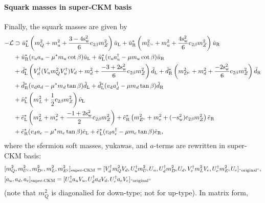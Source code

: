 \documentclass[CheatSheet]{subfiles}
\begin{document}
\paragraph{Squark masses in super-CKM basis}
Finally, the squark masses are given by
\begin{equation}
 \begin{split}
-\mathcal L&\supset
 \tilde u_{\mathrm{L}}^*\left(
   m_{Q}^2
 +  m_u^2
 + \frac{3-4\mathrm{s}_{\mathrm w}^2}{6} \mathrm{c}_{2\beta} m_Z^2
\right)\tilde u_{\mathrm{L}}
 +\tilde u_{\mathrm{R}}^*\left(
   m_{U^{\mathrm{c}}}^2
 + m_u^2
 + \frac{4\mathrm{s}_{\mathrm w}^2}{6} \mathrm{c}_{2\beta} m_Z^2
\right)\tilde u_{\mathrm{R}}
\\&
 + \tilde u_{\mathrm{R}}^*(v_{\mathrm{u}} a_{{\mathrm u}}- \mu^{*}m_{u}\cot\beta)\tilde u_{\mathrm{L}}
 + \tilde u_{\mathrm{L}}^*(v_{\mathrm{u}} a^{\dagger}_{{\mathrm u}}- \mu m_u\cot\beta)\tilde u_{\mathrm{R}}
\\&
 +\tilde d_{\mathrm{L}}^*\left(
V_d^\dagger (V_u m_{Q}^2 V_u^\dagger)V_d
 + m_d^2
 + \frac{-3+2\mathrm{s}_{\mathrm w}^2}{6} \mathrm{c}_{2\beta} m_Z^2
\right)\tilde d_{\mathrm{L}}
 +\tilde d_{\mathrm{R}}^*\left(
   m_{D^{\mathrm{c}}}^2
 + m_d^2
 + \frac{-2\mathrm{s}_{\mathrm w}^2}{6} \mathrm{c}_{2\beta} m_Z^2
\right)\tilde d_{\mathrm{R}}
\\&
 + \tilde d_{\mathrm{R}}^*(v_{\mathrm{d}} a_d -\mu^{*}m_d\tan\beta)\tilde d_{\mathrm{L}}
 + \tilde d_{\mathrm{L}}^*(v_{\mathrm{d}} a^{\dagger}_d-\mu m_d\tan\beta)\tilde d_{\mathrm{R}}
\\&
 +\tilde \nu_{\mathrm{L}}^*\left(
 m_{L}^2
 + \frac{1}{2} \mathrm{c}_{2\beta} m_Z^2
 \right)\tilde \nu_{\mathrm{L}}
\\&
 +\tilde e_{\mathrm{L}}^*\left(
 m_{L}^2
 + m_e^2
 + \frac{-1+2\mathrm{s}_{\mathrm w}^2}{2} \mathrm{c}_{2\beta} m_Z^2
\right)
 +\tilde e_{\mathrm{R}}^*\left(
  m_{E^{\mathrm{c}}}^2
 + m_e^2
 + (-\mathrm{s}_{\mathrm w}^2)\mathrm{c}_{2\beta} m_Z^2
 \right)\tilde e_{\mathrm{R}}
\\&
 + \tilde e_{\mathrm{R}}^*(v_{\mathrm{d}} a_e -\mu^{*}m_e\tan\beta)\tilde e_{\mathrm{L}}
 + \tilde e_{\mathrm{L}}^*(v_{\mathrm{d}} a^{\dagger}_e-\mu m_e\tan\beta)\tilde e_{\mathrm{R}},
 \end{split}
\end{equation}
where the sfermion soft masses, yukawas, and $a$-terms are rewritten in super-CKM basis:
\begin{align}
& [m_Q^2, m_{U^{\mathrm{c}}}^2, m_{D^{\mathrm{c}}}^2,m_L^2,m_{E^{\mathrm{c}}}^2]_{\text{super-CKM}}
=
 [V_d^\dagger m_Q^2 V_d, U_u^\dagger m_{U^{\mathrm{c}}}^2 U_u, U_d^\dagger m_{D^{\mathrm{c}}}^2 U_d,
V_e^\dagger m_L^2 V_e, U_e^\dagger m_{E^{\mathrm{c}}}^2 U_e
]_{\text{``original''}},
\\
&[a_u, a_d, a_e]_{\text{super-CKM}}
=[U_u^\dagger a_u V_u, U_d^\dagger a_d V_d, U_e^\dagger a_e V_e
]_{\text{``original''}}
\end{align}
(note that $m_Q^2$ is diagonalied for down-type; not for up-type). In matrix form,
\end{document}
